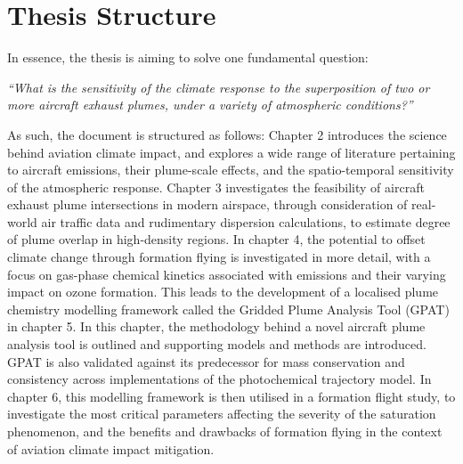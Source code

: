 \section{Thesis Structure}
In essence, the thesis is aiming to solve one fundamental question:

\textit{“What is the sensitivity of the climate response to the superposition of two or more aircraft exhaust plumes, under a variety of atmospheric conditions?”} 

As such, the document is structured as follows: Chapter 2 introduces the science behind aviation climate impact, and explores a wide range of literature pertaining to aircraft emissions, their plume-scale effects, and the spatio-temporal sensitivity of the atmospheric response. Chapter 3 investigates the feasibility of aircraft exhaust plume intersections in modern airspace, through consideration of real-world air traffic data and rudimentary dispersion calculations, to estimate degree of plume overlap in high-density regions. In chapter 4, the potential to offset climate change through formation flying is investigated in more detail, with a focus on gas-phase chemical kinetics associated with  emissions and their varying impact on ozone formation. This leads to the development of a localised plume chemistry modelling framework called the Gridded Plume Analysis Tool (GPAT) in chapter 5. In this chapter, the methodology behind a novel aircraft plume analysis tool is outlined and supporting models and methods are introduced. GPAT is also validated against its predecessor for mass conservation and consistency across implementations of the photochemical trajectory model. In chapter 6, this modelling framework is then utilised in a formation flight study, to investigate the most critical parameters affecting the severity of the  saturation phenomenon, and the benefits and drawbacks of formation flying in the context of aviation climate impact mitigation.